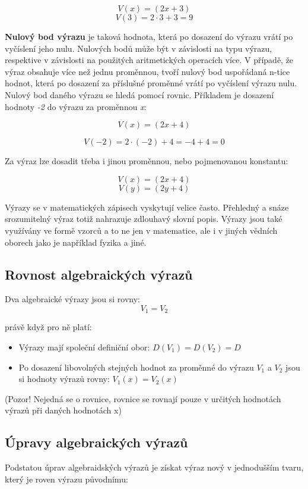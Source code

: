 \documentclass[11pt]{article}
\begin{document}
$$ V(x) = (2x + 3) $$ 
$$ V(3) = 2\cdot 3 + 3 = 9 $$

{\bf Nulový bod výrazu} je taková hodnota, která po dosazení do výrazu vrátí po vyčíslení jeho nulu. Nulových bodů může být v závislosti na typu výrazu, respektive v závislosti na použitých aritmetických operacích více. V případě, že výraz obsahuje více než jednu proměnnou, tvoří nulový bod uspořádaná n-tice hodnot, která po dosazení za příslušné proměnné vrátí po vyčíslení výrazu nulu. Nulový bod daného výrazu se hledá pomocí rovnic. Příkladem je dosazení hodnoty {\it -2} do výrazu za proměnnou {\it x}:

$$ V(x) = (2x + 4)$$

$$ V(-2) = 2 \cdot (-2) +4 = -4 +4 = 0 $$

Za výraz lze dosadit třeba i jinou proměnnou, nebo pojmenovanou konstantu:

$$ V(x) = (2x + 4)$$
$$ V(y) = (2y + 4)$$

Výrazy se v matematických zápisech vyskytují velice často. Přehledný a snáze srozumitelný výraz totiž nahrazuje zdlouhavý slovní popis. Výrazy jsou také využívány ve formě vzorců a to ne jen v matematice, ale i v jiných vědních oborech jako je například fyzika a jiné.

\subsection{Rovnost algebraických výrazů}

Dva algebraické výrazy jsou si rovny:
$$ V_1 = V_2 $$

právě když pro ně platí:

\begin{itemize}
\item Výrazy mají společní definiční obor: $D(V_1) = D(V_2) = D$
\item Po dosazení libovolných stejných hodnot za proměnné do výrazu $V_1$ a $V_2$ jsou si hodnoty výrazů rovny: $V_1(x) = V_2(x)$
\end{itemize}


(Pozor! Nejedná se o rovnice, rovnice se rovnají pouze v určitých hodnotách výrazů při daných hodnotách x)


\subsection{Úpravy algebraických výrazů}

Podstatou úprav algebraidských výrazů je získat výraz nový v jednodušším tvaru, který je roven výrazu původnímu:
\end{document}
